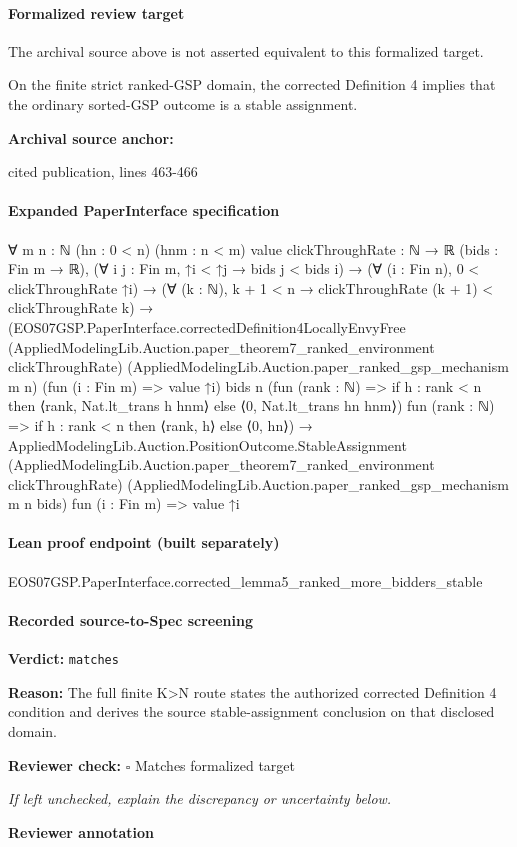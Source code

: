 \documentclass[10pt]{article}
\newcommand{\reviewerbox}{%
  \par\noindent\fbox{\parbox{0.96\linewidth}{\rule{0pt}{0.38in}}}\par
}
\newcommand{\reviewmatch}[1]{%
  \par\noindent\textbf{Reviewer check:} $\square$\; #1\par
  \noindent\emph{If left unchecked, explain the discrepancy or uncertainty below.}\par
}
\begin{document}
\paragraph{Formalized review target}
The archival source above is not asserted equivalent to this formalized target.
\begin{ReviewVerbatim}
On the finite strict ranked-GSP domain, the corrected Definition 4 implies that the ordinary sorted-GSP outcome is a stable assignment.
\end{ReviewVerbatim}

\textbf{Archival source anchor:} {\footnotesize\raggedright cited publication, lines 463-\allowbreak{}466\par}
\paragraph{Expanded PaperInterface specification}
\begin{ReviewVerbatim}
∀ {m n : ℕ} (hn : 0 < n) (hnm : n < m) {value clickThroughRate : ℕ → ℝ} (bids : Fin m → ℝ),
  (∀ {i j : Fin m}, ↑i < ↑j → bids j < bids i) →
    (∀ (i : Fin n), 0 < clickThroughRate ↑i) →
      (∀ (k : ℕ), k + 1 < n → clickThroughRate (k + 1) < clickThroughRate k) →
        (EOS07GSP.PaperInterface.correctedDefinition4LocallyEnvyFree
            (AppliedModelingLib.Auction.paper_theorem7_ranked_environment clickThroughRate)
            (AppliedModelingLib.Auction.paper_ranked_gsp_mechanism m n) (fun (i : Fin m) => value ↑i) bids n
            (fun (rank : ℕ) => if h : rank < n then ⟨rank, Nat.lt_trans h hnm⟩ else ⟨0, Nat.lt_trans hn hnm⟩)
            fun (rank : ℕ) => if h : rank < n then ⟨rank, h⟩ else ⟨0, hn⟩) →
          AppliedModelingLib.Auction.PositionOutcome.StableAssignment
            (AppliedModelingLib.Auction.paper_theorem7_ranked_environment clickThroughRate)
            (AppliedModelingLib.Auction.paper_ranked_gsp_mechanism m n bids) fun (i : Fin m) => value ↑i
\end{ReviewVerbatim}



\paragraph{Lean proof endpoint (built separately)}\begin{ReviewVerbatim}
EOS07GSP.PaperInterface.corrected_lemma5_ranked_more_bidders_stable
\end{ReviewVerbatim}

\paragraph{Recorded source-to-Spec screening}
\textbf{Verdict:} \texttt{matches}
\\
{\raggedright
\textbf{Reason:} The full finite K>N route states the authorized corrected Definition 4 condition and derives the source stable-\allowbreak{}assignment conclusion on that disclosed domain.\allowbreak{}
\par}
\reviewmatch{Matches formalized target}
\noindent\textbf{Reviewer annotation}\par
\reviewerbox
\clearpage
\hypertarget{source-claim-f495e2be93092237}{}
\end{document}
